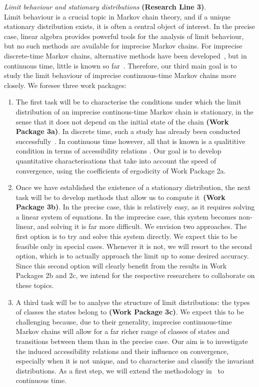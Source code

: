 \documentclass[11pt,dvipsnames,usenames,a4paper]{article}
\begin{document}
\emph{Limit behaviour and stationary distributions} {\bf (Research Line 3)}.\\[3pt]
Limit behaviour is a crucial topic in Markov chain theory, and if a unique stationary distribution exists, it is often a central object of interest. 
In the precise case, linear algebra provides powerful tools for the analysis of limit behaviour, but no such methods are available for imprecise Markov chains. 
For imprecise discrete-time Markov chains, alternative methods have been developed~\cite{cooman2008,hermans2012,skulj:13b,skulj2013}, but in continuous time, little is known so far~\cite{DeBock:2016:iCTMClimit,erreygers2017:ictmcs}. 
Therefore, our third main goal is to study the limit behaviour of imprecise continuous-time Markov chains more closely. 
We foresee three work packages:
\begin{enumerate}[label=\tiny$\blacksquare$,leftmargin=*,noitemsep]
\item The first task will be to characterise the conditions under which the limit distribution of an imprecise continous-time Markov chain is stationary, in the sense that it does not depend on the initial state of the chain {\bf (Work Package 3a)}. 
In discrete time, such a study has already been conducted successfully~\cite{hermans2012,cooman2008,skulj2013}. 
In continuous time however, all that is known is a qualititive condition in terms of accessibility relations \cite{DeBock:2016:iCTMClimit}. Our goal is to develop quantitative characterisations that take into account the speed of convergence, using the coefficients of ergodicity of Work Package 2a.
\item Once we have established the existence of a stationary distribution, the next task will be to develop methods that allow us to compute it~{\bf (Work Package 3b)}. 
In the precise case, this is relatively easy, as it requires solving a linear system of equations. 
In the imprecise case, this system becomes non-linear, and solving it is far more difficult. 
We envision two approaches. 
The first option is to try and solve this system directly. 
We expect this to be feasible only in special cases. 
Whenever it is not, we will resort to the second option, which is to actually approach the limit up to some desired accuracy. 
Since this second option will clearly benefit from the results in Work Packages 2b and 2c, we intend for the respective researchers to collaborate on these topics.
\item A third task will be to analyse the structure of limit distributions: the types of classes the states belong to {\bf (Work Package 3c)}.
We expect this to be challenging because, due to their generality, imprecise continuous-time Markov chains will allow for a far richer range of classes of states and transitions between them than in the precise case. 
Our aim is to investigate the induced accessibility relations and their influence on convergence, especially when it is not unique, and to characterise and classify the invariant distributions. 
As a first step, we will extend the methodology in~\cite{skulj:13b} to continuous time. 
\end{enumerate}
\end{document}
